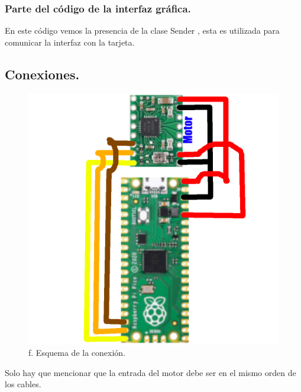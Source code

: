 \documentclass{article}
\begin{document}
            \subsubsection*{Parte del código de la interfaz gráfica.}
            
            En este código vemos la presencia de la clase Sender \cite{ref1}, esta es utilizada para comunicar la interfaz con la tarjeta.
        \subsection*{Conexiones.}
            \begin{figure}[H]
                \centering
                \includegraphics[width=\linewidth]{conexion.png}
                \caption{f. \cite{refi1} \cite{refi2} Esquema de la conexión.}
            \end{figure}
            Solo hay que mencionar que la entrada del motor debe ser en el mismo orden de los cables.
    \newpage
\end{document}
